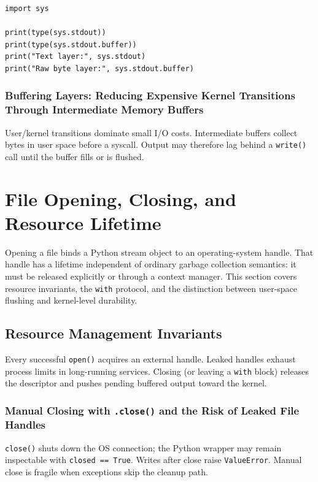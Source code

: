 \documentclass[a4paper,twoside]{report}
\begin{document}
\begin{verbatim}
import sys

print(type(sys.stdout))
print(type(sys.stdout.buffer))
print("Text layer:", sys.stdout)
print("Raw byte layer:", sys.stdout.buffer)
\end{verbatim}

\subsubsection{Buffering Layers: Reducing Expensive Kernel Transitions Through Intermediate Memory Buffers}

User/kernel transitions dominate small I/O costs. Intermediate buffers collect bytes in user space before a syscall. Output may therefore lag behind a \texttt{write()} call until the buffer fills or is flushed.


\section{File Opening, Closing, and Resource Lifetime}

Opening a file binds a Python stream object to an operating-system handle. That handle has a lifetime independent of ordinary garbage collection semantics: it must be released explicitly or through a context manager. This section covers resource invariants, the \texttt{with} protocol, and the distinction between user-space flushing and kernel-level durability.


\subsection{Resource Management Invariants}

Every successful \texttt{open()} acquires an external handle. Leaked handles exhaust process limits in long-running services. Closing (or leaving a \texttt{with} block) releases the descriptor and pushes pending buffered output toward the kernel.

\subsubsection{Manual Closing with \texttt{.close()} and the Risk of Leaked File Handles}

\texttt{close()} shuts down the OS connection; the Python wrapper may remain inspectable with \texttt{closed == True}. Writes after close raise \texttt{ValueError}. Manual close is fragile when exceptions skip the cleanup path.
\end{document}
